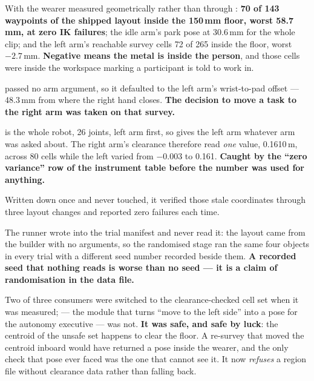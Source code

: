 
{With the wearer measured geometrically rather than through
: \textbf{70 of 143 waypoints of the shipped layout
inside the 150\,mm floor, worst 58.7\,mm, at zero IK failures}; the idle arm's
park pose at 30.6\,mm for the whole clip; and the left arm's reachable survey
cells 72 of 265 inside the floor, worst $-2.7$\,mm. \textbf{Negative means the
metal is inside the person}, and those cells were inside the workspace marking
a participant is told to work in.}

{ passed no arm argument, so it defaulted to the
left arm's wrist-to-pad offset --- 48.3\,mm from where the right hand closes.
\textbf{The decision to move a task to the right arm was taken on that survey.}}

{ is the whole robot, 26 joints, left arm first,
so  gives the left arm whatever arm was asked about. The
right arm's clearance therefore read \emph{one} value, 0.1610\,m, across 80
cells while the left varied from $-0.003$ to 0.161. \textbf{Caught by the ``zero
variance'' row of the instrument table before the number was used for
anything.}}

{Written down once and never touched, it verified those stale coordinates
through three layout changes and reported zero failures each time.}

{The runner wrote  into the trial manifest and never read it: the
layout came from the builder with no arguments, so the randomised stage ran the
same four objects in every trial with a different seed number recorded beside
them. \textbf{A recorded seed that nothing reads is worse than no seed --- it is
a claim of randomisation in the data file.}}

{Two of three consumers were switched to the clearance-checked cell set when it
was measured;  --- the module that turns ``move to the
left side'' into a pose for the autonomy executive --- was not. \textbf{It was
safe, and safe by luck}: the centroid of the unsafe set happens to clear the
floor. A re-survey that moved the centroid inboard would have returned a pose
inside the wearer, and the only check that pose ever faced was the one that
cannot see it. It now \emph{refuses} a region file without clearance data
rather than falling back.}

